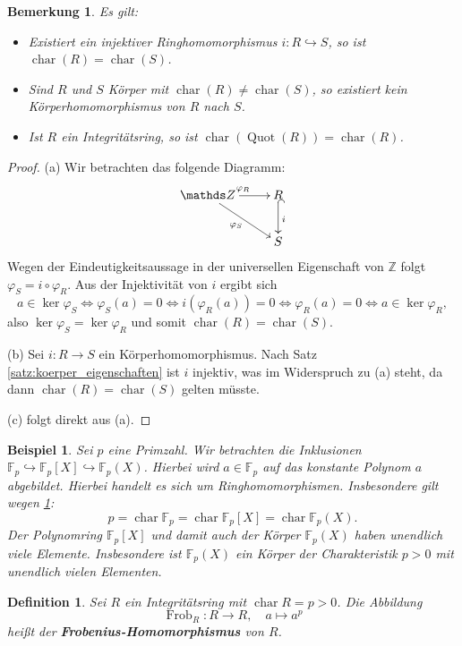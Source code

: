 \documentclass[a4paper, twoside, 11pt, ngerman]{report}
\newcommand{\FF}{\mathds F}
\newcommand{\ZZ}{\mathds Z}
\DeclareMathOperator{\charact}{char}
\DeclareMathOperator{\Frob}{Frob}
\DeclareMathOperator{\Quot}{Quot}
\theoremstyle{definistyle}
\newtheorem{defini}[satz]{Definition}
\newtheorem{bem}[satz]{Bemerkung}
\newtheorem{bsp}[satz]{Beispiel}
\theoremstyle{remark}
\newcommand{\defn}[1]{\textit{\bfseries #1}}
\begin{document}
\begin{bem}\label{bem:charakteristik_int_koerper}
Es gilt:
\begin{itemize}
    \item[(a)] Existiert ein injektiver Ringhomomorphismus $i \colon R \hookrightarrow S$, so ist $\charact(R) = \charact(S)$.
    \item[(b)] Sind $R$ und $S$ Körper mit $\charact(R) \neq \charact(S)$, so existiert kein Körperhomomorphismus von $R$ nach $S$.
    \item[(c)] Ist $R$ ein Integritätsring, so ist $\charact(\Quot(R))=\charact(R)$.
\end{itemize}
\end{bem}

\begin{proof}
(a) Wir betrachten das folgende Diagramm:
\[
\xymatrix{
\ZZ \ar[r]^{\varphi_R} \ar[dr]_{\varphi_S} & R \ar@{^{(}->}[d]^i \\
& S
}
\]
Wegen der Eindeutigkeitsaussage in der universellen Eigenschaft von $\ZZ$ folgt $\varphi_S = i \circ \varphi_R$. 
Aus der Injektivität von $i$ ergibt sich
\[
a \in \ker \varphi_S \iff \varphi_S(a) = 0 \iff i(\varphi_R(a)) = 0 \iff \varphi_R(a) = 0 \iff a \in \ker \varphi_R,
\]
also $\ker \varphi_S = \ker \varphi_R$ und somit $\charact(R) = \charact(S)$.

(b) Sei $i \colon R \to S$ ein Körperhomomorphismus. Nach Satz \ref{satz:koerper_eigenschaften} ist $i$ injektiv, was im Widerspruch zu (a) steht, da dann $\charact(R) = \charact(S)$ gelten müsste.

(c) folgt direkt aus (a).
\end{proof}

\begin{bsp}
Sei $p$ eine Primzahl. Wir betrachten die Inklusionen $\FF_p\hookrightarrow\FF_p[X]\hookrightarrow\FF_p(X)$. Hierbei wird $a\in\FF_p$
auf das konstante Polynom $a$ abgebildet. Hierbei handelt es sich um Ringhomomorphismen.
Insbesondere gilt wegen \ref{bem:charakteristik_int_koerper}:
\[
p=\charact \FF_p=\charact \FF_p[X]=\charact\FF_p(X).
\]
Der Polynomring $\FF_p[X]$ und damit auch der Körper $\FF_p(X)$ haben unendlich viele Elemente.
Insbesondere ist $\FF_p(X)$ ein Körper der Charakteristik $p>0$ mit unendlich vielen Elementen.
\end{bsp}

\begin{defini}\label{bem:frobenius_hom}
Sei $R$ ein Integritätsring mit $\charact R = p > 0$. Die Abbildung
\[
\Frob_R \colon R \to R, \quad a \mapsto a^p
\]
heißt der \defn{Frobenius-Homomorphismus} von $R$.
\end{defini}
\end{document}

